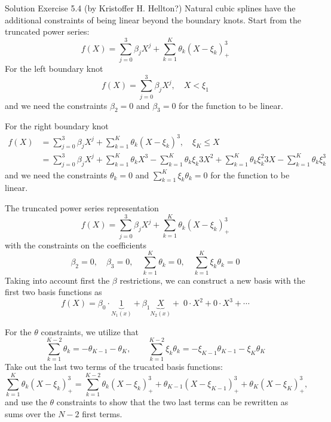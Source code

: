 \documentclass[mathserif,10pt,handout]{beamer}
\begin{document}
\begin{frame}{Solution Exercise 5.4 (by Kristoffer H. Hellton?)}
Natural cubic splines have the additional constraints of being linear beyond the boundary knots. Start from the truncated power series:
$$f(X) = \sum_{j=0}^{3}\beta_{j}X^j+ \sum_{k=1}^K\theta_{k}(X-\xi_{k})^3_{+}$$ 
\pause
For the left boundary knot 
$$f(X) = \sum_{j=0}^{3}\beta_{j}X^j, \quad X < \xi_{1} $$
and we need the constraints $\beta_{2}=0$ and $\beta_{3}=0$ for the function to be linear.  
\end{frame}

\begin{frame}
For the right boundary knot
\begin{align*}
f(X) &= \sum_{j=0}^{3}\beta_{j}X^j+\sum_{k=1}^K\theta_{k}(X-\xi_{k})^3, \quad  \xi_{K} \leq X \\
&= \sum_{j=0}^{3}\beta_{j}X^j + \sum_{k=1}^K\theta_{k}X^3 - \sum_{k=1}^K\theta_{k}\xi_{k} 3 X^2  + \sum_{k=1}^K\theta_{k} \xi_{k}^2 3 X  - \sum_{k=1}^K\theta_{k} \xi_{k}^3 
\end{align*}
\pause
and we need the constraints $ \theta_{k}=0 $ and  $\sum_{k=1}^K \xi_{k}\theta_{k}=0$ for the function to be linear.  
\end{frame}


\begin{frame}
The truncated power series representation
$$f(X) = \sum_{j=0}^{3}\beta_{j}X^j+ \sum_{k=1}^K\theta_{k}(X-\xi_{k})^3_{+}$$
with the  constraints on the coefficients
$$\beta_{2}=0,\quad\beta_{3}=0, \quad \sum_{k=1}^K  \theta_{k}=0,\quad\sum_{k=1}^K \xi_{k}\theta_{k}=0$$
\pause
Taking into account first the $\beta$ restrictions, we can construct a new basis with the first two basis functions as
$$ f(X) = \beta_{0}\cdot \underbrace{1}_{N_{1}(x)}+\beta_{1}\underbrace{X}_{N_{2}(x)}+\;0 \cdot X^2+0\cdot X^3+\cdots $$
\end{frame}

\begin{frame}
For the $\theta$ constraints, we utilize that 
$$\sum_{k=1}^{K-2}  \theta_{k}= -\theta_{K-1}-\theta_{K},\qquad\sum_{k=1}^{K-2} \xi_{k}\theta_{k}=- \xi_{K-1}\theta_{K-1}- \xi_{K}\theta_{K} $$
\pause
Take out the last two terms of the trucated basis functions: \pause
$$\sum_{k=1}^K\theta_{k}(X-\xi_{k})^3_{+} = \sum_{k=1}^{K-2}\theta_{k}(X-\xi_{k})^3_{+} + \theta_{K-1}(X-\xi_{K-1})^3_{+}+\theta_{K}(X-\xi_{K})^3_{+}, $$\pause
and use the $\theta$ constraints to show that the two last terms can be rewritten as sums over the $N-2$ first terms.
\end{frame}
\end{document}
